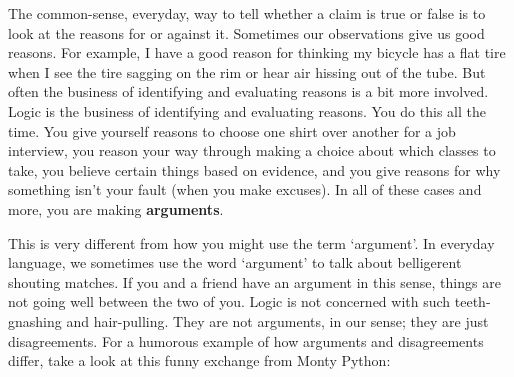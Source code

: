 The common-sense, everyday, way to tell whether a claim is true or false is to look at the reasons for or against it. Sometimes our observations give us good reasons. For example, I have a good reason for thinking my bicycle has a flat tire when I see the tire sagging on the rim or hear air hissing out of the tube. But often the business of identifying and evaluating reasons is a bit more involved. Logic is the business of identifying and evaluating reasons. You do this all the time. You give yourself reasons to choose one shirt over another for a job interview, you reason your way through making a choice about which classes to take, you believe certain things based on evidence, and you give reasons for why something isn't your fault (when you make excuses). In all of these cases and more, you are making \textbf{arguments}.

This is very different from how you might use the term ‘argument'. In everyday language, we sometimes use the word ‘argument’ to talk about belligerent shouting matches. If you and a friend have an argument in this sense, things are not going well between the two of you. Logic is not concerned with such teeth-gnashing and hair-pulling. They are not arguments, in our sense; they are just disagreements. For a humorous example of how arguments and disagreements differ, take a look at this funny exchange from Monty Python:\autocite{ArgumentClinic}


